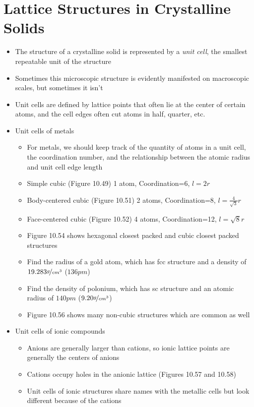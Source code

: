 \documentclass[12pt, openany, letterpaper]{memoir}
\begin{document}
\section{Lattice Structures in Crystalline Solids}
\begin{itemize}
  \item The structure of a crystalline solid is represented by a \emph{unit cell}, the smallest repeatable unit of the structure
  \item Sometimes this microscopic structure is evidently manifested on macroscopic scales, but sometimes it isn't
  \item Unit cells are defined by lattice points that often lie at the center of certain atoms, and the cell edges often cut atoms in half, quarter, etc.
  \item Unit cells of metals
  \begin{itemize}
    \item For metals, we should keep track of the quantity of atoms in a unit cell, the coordination number, and the relationship between the atomic radius and unit cell edge length
    \item Simple cubic (Figure 10.49) 1 atom, Coordination=6, $l=2r$
    \item Body-centered cubic (Figure 10.51) 2 atoms, Coordination=8, $l=\frac{4}{\sqrt{3}}r$
    \item Face-centered cubic (Figure 10.52) 4 atoms, Coordination=12, $l=\sqrt{8}r$
    \item Figure 10.54 shows hexagonal closest packed and cubic closest packed structures
    \item Find the radius of a gold atom, which has fcc structure and a density of $19.283\nicefrac{g}{cm^3}$ ($136pm$)
    \item Find the density of polonium, which has sc structure and an atomic radius of $140pm$ ($9.20\nicefrac{g}{cm^3}$)
    \item Figure 10.56 shows many non-cubic structures which are common as well
  \end{itemize}
  \item Unit cells of ionic compounds
  \begin{itemize}
    \item Anions are generally larger than cations, so ionic lattice points are generally the centers of anions
    \item Cations occupy holes in the anionic lattice (Figures 10.57 and 10.58)
    \item Unit cells of ionic structures share names with the metallic cells but look different because of the cations

\end{itemize}
\end{itemize}
\end{document}
